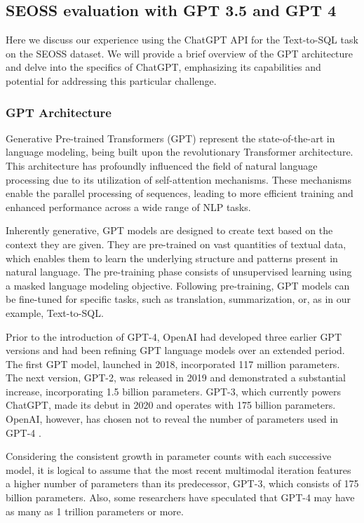 \subsection{SEOSS evaluation with GPT 3.5 and GPT 4}  

Here we discuss our experience using the ChatGPT API for the Text-to-SQL task on the SEOSS dataset. We will provide a brief overview of the GPT architecture and delve into the specifics of ChatGPT, emphasizing its capabilities and potential for addressing this particular challenge.
\subsubsection{GPT Architecture}

Generative Pre-trained Transformers (GPT) \cite{radford2018improving} represent the state-of-the-art in language modeling, being built upon the revolutionary Transformer architecture. This architecture has profoundly influenced the field of natural language processing due to its utilization of self-attention mechanisms. These mechanisms enable the parallel processing of sequences, leading to more efficient training and enhanced performance across a wide range of NLP tasks.

Inherently generative, GPT models are designed to create text based on the context they are given. They are pre-trained on vast quantities of textual data, which enables them to learn the underlying structure and patterns present in natural language. The pre-training phase consists of unsupervised learning using a masked language modeling objective. Following pre-training, GPT models can be fine-tuned for specific tasks, such as translation, summarization, or, as in our example, Text-to-SQL.

Prior to the introduction of GPT-4, OpenAI had developed three earlier GPT versions and had been refining GPT language models over an extended period. The first GPT model, launched in 2018, incorporated 117 million parameters. The next version, GPT-2, was released in 2019 and demonstrated a substantial increase, incorporating 1.5 billion parameters. GPT-3, which currently powers ChatGPT, made its debut in 2020 and operates with 175 billion parameters. OpenAI, however, has chosen not to reveal the number of parameters used in GPT-4 \cite{openai2023gpt4}.

Considering the consistent growth in parameter counts with each successive model, it is logical to assume that the most recent multimodal iteration features a higher number of parameters than its predecessor, GPT-3, which consists of 175 billion parameters. Also, some researchers have speculated that GPT-4 may have as many as 1 trillion parameters or more\cite{bubeck2023sparks}.

